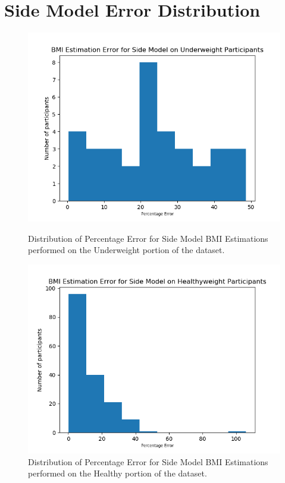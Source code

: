 \documentclass[conference]{IEEEtran}
\begin{document}
\section{Side Model Error Distribution}

\begin{figure}[H]
    \centering
    \begin{minipage}[b]{0.35\textwidth}
    \includegraphics[width=\linewidth]{sideundererror.png}
    \caption{Distribution of Percentage Error for Side Model BMI Estimations performed on the Underweight portion of the dataset.}
    \label{fig:sideundererror}
    \end{minipage}
    \hspace{1cm}
    \begin{minipage}[b]{0.35\textwidth}
    \includegraphics[width=\linewidth]{sidehealthyerror.png}
    \caption{Distribution of Percentage Error for Side Model BMI Estimations performed on the Healthy portion of the dataset.}
    \label{fig:sidehealthyerror}
    \end{minipage}
\end{figure}
\end{document}
